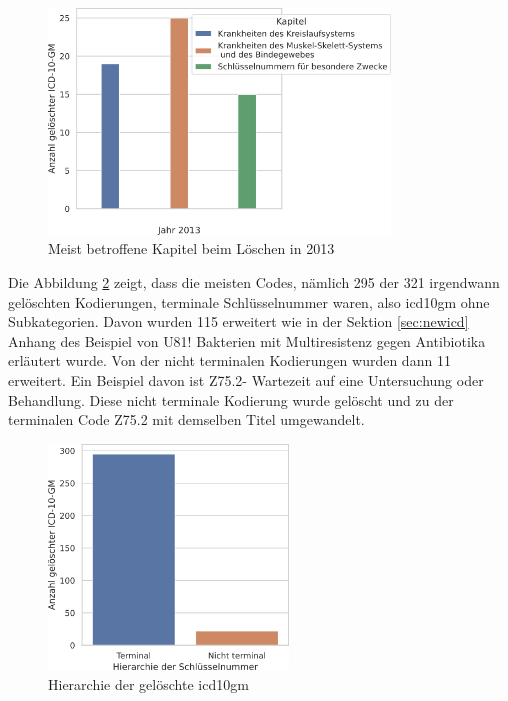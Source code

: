 \clearpage

\begin{figure}[ht]
	\centering
	\includegraphics[height=6cm]{figures/kaptnr13}
	\caption{Meist betroffene Kapitel beim Löschen in 2013}
	\label{fig:kap13}
\end{figure}


Die Abbildung \ref{fig:oldicdort} zeigt, dass die meisten Codes, nämlich \textsf{295} der \textsf{321} irgendwann gelöschten Kodierungen, terminale Schlüsselnummer waren, also \ac{icd10gm} ohne Subkategorien. Davon wurden \textsf{115} erweitert wie in der Sektion \ref{sec:newicd} Anhang des Beispiel von \textsf{U81!} \textsf{Bakterien mit Multiresistenz gegen Antibiotika} erläutert wurde. Von der nicht terminalen Kodierungen wurden dann \textsf{11} erweitert. Ein Beispiel davon ist \textsf{Z75.2-} \textsf{Wartezeit auf eine Untersuchung oder Behandlung}. Diese nicht terminale Kodierung wurde gelöscht und zu der terminalen Code \textsf{Z75.2} mit demselben Titel umgewandelt. 


\begin{figure}[ht]
	\centering
	\includegraphics[height=6cm]{figures/ortoldYear}
	\caption{Hierarchie der gelöschte \acs{icd10gm}}
	\label{fig:oldicdort}
\end{figure}


